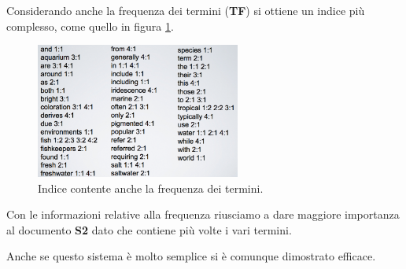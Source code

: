 Considerando anche la frequenza dei termini (\textbf{TF}) si ottiene un indice più complesso, come quello in figura \ref{fig:index-freq}.

\begin{figure}[htbp]
	\centering
	\includegraphics[width=0.6\textwidth]{./images/l6-index-2}
	\caption{Indice contente anche la frequenza dei termini.}\label{fig:index-freq}
\end{figure}

\noindent Con le informazioni relative alla frequenza riusciamo a dare maggiore importanza al documento \textbf{S2} dato che contiene più volte i vari termini.

Anche se questo sistema è molto semplice si è comunque dimostrato efficace.



